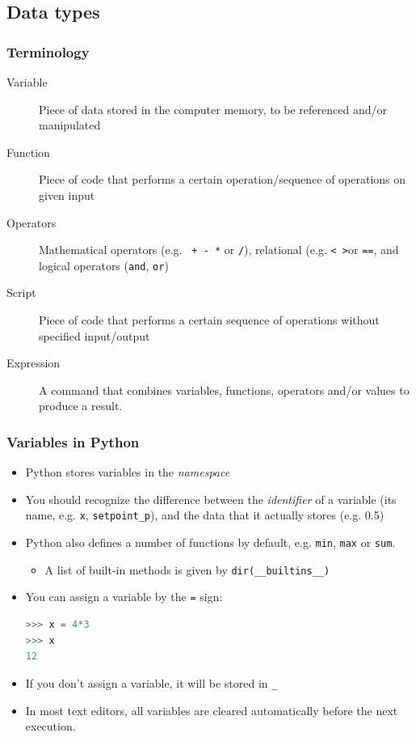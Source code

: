 \subsection{Data types}
\begin{frame}[fragile]
 \frametitle{Terminology}
 \begin{description}
  \item[Variable] Piece of data stored in the computer memory, to be referenced and/or manipulated
  \item[Function] Piece of code that performs a certain operation/sequence of operations on given input
  \item[Operators] Mathematical operators (e.g. \lstinline$ + - *$ or \lstinline$/$), relational (e.g. \lstinline$< >$or \lstinline$==$, and logical operators (\lstinline$and$, \lstinline$or$)
  \item[Script] Piece of code that performs a certain sequence of operations without specified input/output
  \item[Expression] A command that combines variables, functions, operators and/or values to produce a result.
 \end{description}
\end{frame}

\begin{frame}[fragile]
 \frametitle{Variables in Python}
  \begin{itemize}
    \item Python stores variables in the \emph{namespace}
    \item You should recognize the difference between the \emph{identifier} of a variable (its name, e.g. \lstinline$x$, \lstinline$setpoint_p$), and the data that it actually stores (e.g. 0.5)
    \item Python also defines a number of functions by default, e.g. \lstinline$min$, \lstinline$max$ or \lstinline$sum$.
    \begin{itemize}
      \item A list of built-in methods is given by \lstinline$dir(__builtins__)$
    \end{itemize}
    \item You can assign a variable by the \lstinline$=$ sign:
   \begin{lstlisting}[language=Python, numbers=none]
>>> x = 4*3
>>> x
12
   \end{lstlisting}
   \item If you don't assign a variable, it will be stored in \lstinline$_$
   \item In most text editors, all variables are cleared automatically before the next execution. 
 \end{itemize}
\end{frame}

